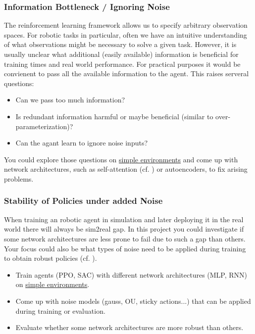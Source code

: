 \documentclass[a4paper]{article}
\begin{document}
\subsubsection{Information Bottleneck / Ignoring Noise}
The reinforcement learning framework allows us to specify arbitrary observation spaces.
For robotic tasks in particular, often we have an intuitive understanding of what observations might be necessary to solve a given task.
However, it is usually unclear what additional (easily available) information is beneficial for training times and real world performance.
For practical purposes it would be convienent to pass all the available information to the agent.
This raises serveral questions:
\begin{itemize}
  \item Can we pass too much information?
  \item Is redundant information harmful or maybe beneficial (similar to over-parameterization)?
  \item Can the agant learn to ignore noise inputs?
\end{itemize}
You could explore those questions on \href{https://gymnasium.farama.org/environments/mujoco/}{simple environments} and come up with network architectures, such as self-attention (cf. \citet{Tang2020}) or autoencoders, to fix arising problems.





\subsubsection{Stability of Policies under added Noise}
When training an robotic agent in simulation and later deploying it in the real world there will always be sim2real gap.
In this project you could investigate if some network architectures are less prone to fail due to such a gap than others.
Your focus could also be what types of noise need to be applied during training to obtain robust policies (cf. \citet{Sinha2021}).
\begin{itemize}
  \item Train agents (PPO, SAC) with different network architectures (MLP, RNN) on \href{https://gymnasium.farama.org/environments/mujoco/}{simple environments}.
  \item Come up with noise models (gauss, OU, sticky actions...) that can be applied during training or evaluation.
  \item Evaluate whether some network architectures are more robust than others.
\end{itemize}
\end{document}

